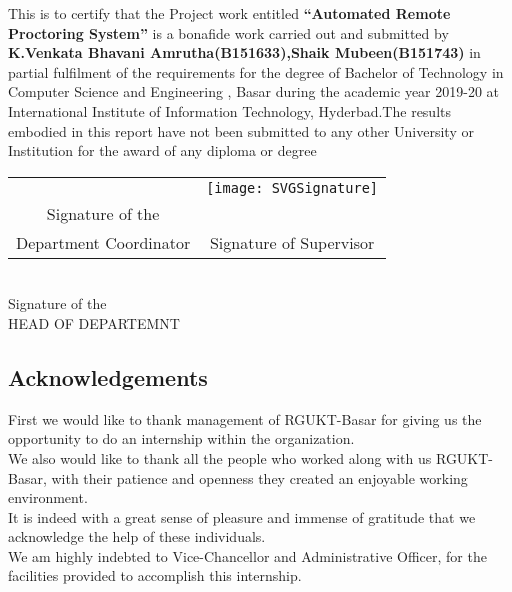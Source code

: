 \documentclass[12pt]{report}
\begin{document}
This is to certify that the Project work entitled \textbf{“Automated Remote Proctoring System”} is a bonafide work
carried out and submitted by \textbf{K.Venkata Bhavani Amrutha(B151633),Shaik Mubeen(B151743)} in partial fulfilment of the requirements for the degree of Bachelor of Technology in Computer Science and Engineering , Basar during the academic year 2019-20 at International Institute of Information Technology, Hyderbad.The results embodied in this report have not been submitted to any other University or Institution for the award of any diploma or degree\\
\vspace{0.2in}
\begin{center}
\begin{tabular}{c c}
\textbf {} & \hspace{5cm}  \texttt{[image: SVGSignature]}\\
Signature of the\\ Department Coordinator  & \hspace{5cm} Signature of Supervisor\\
\end{tabular}\\
\vspace{0.5in}
Signature of the \\HEAD OF DEPARTEMNT\\
\end{center}

\pagebreak


\begin{center}
\section*{Acknowledgements}
\end{center}

First we would like to thank management of RGUKT-Basar for giving us the opportunity to do an internship within the organization.\\

We also would like to thank all the people who worked along with us RGUKT-Basar, with their patience and openness they created an enjoyable working environment.\\

It is indeed with a great sense of pleasure and immense of gratitude that we acknowledge the help of these individuals.\\

We am highly indebted to Vice-Chancellor and Administrative Officer, for the facilities provided to accomplish this internship.\\
\end{document}
